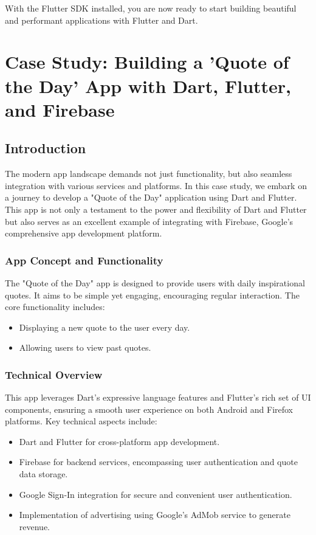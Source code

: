 \documentclass{book}
\begin{document}
With the Flutter SDK installed, you are now ready to start building beautiful and performant applications with Flutter and Dart.

\chapter{Case Study: Building a 'Quote of the Day' App with Dart, Flutter, and Firebase}

\section{Introduction}
The modern app landscape demands not just functionality, but also seamless integration with various services and platforms. In this case study, we embark on a journey to develop a "Quote of the Day" application using Dart and Flutter. This app is not only a testament to the power and flexibility of Dart and Flutter but also serves as an excellent example of integrating with Firebase, Google's comprehensive app development platform.

\subsection{App Concept and Functionality}
The "Quote of the Day" app is designed to provide users with daily inspirational quotes. It aims to be simple yet engaging, encouraging regular interaction. The core functionality includes:
\begin{itemize}
    \item Displaying a new quote to the user every day.
    \item Allowing users to view past quotes.
\end{itemize}

\subsection{Technical Overview}
This app leverages Dart's expressive language features and Flutter's rich set of UI components, ensuring a smooth user experience on both Android and Firefox platforms. Key technical aspects include:
\begin{itemize}
    \item Dart and Flutter for cross-platform app development.
    \item Firebase for backend services, encompassing user authentication and quote data storage.
    \item Google Sign-In integration for secure and convenient user authentication.
    \item Implementation of advertising using Google's AdMob service to generate revenue.
\end{itemize}
\end{document}

